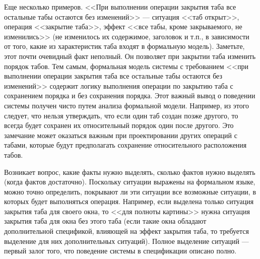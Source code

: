 \documentclass[14pt, twoside]{extreport}
\begin{document}
Еще несколько примеров. <<При выполнении операции закрытия таба все остальные табы остаются без изменений>> --- ситуация <<таб открыт>>, операция <<закрытие таба>>, эффект <<все табы, кроме закрываемого, не изменились>> (не изменилось их содержимое, заголовок и т.п., в зависимости от того, какие из характеристик таба входят в формальную модель). Заметьте, этот почти очевидный факт неполный. Он позволяет при закрытии таба изменить порядок табов. Тем самым, формальная модель системы с требованием <<при выполнении операции закрытия таба все остальные табы остаются без изменений>> содержит логику выполнения операции по закрытию таба с сохранением порядка и без сохранения порядка. Этот важный вывод о поведении системы получен чисто путем анализа формальной модели. Например, из этого следует, что нельзя утверждать, что если один таб создан позже другого, то всегда будет сохранен их относительный порядок один после другого. Это замечание может оказаться важным при проектировании других операций с табами, которые будут предполагать сохранение относительного расположения табов.

Возникает вопрос, какие факты нужно выделять, сколько фактов нужно выделять (когда фактов достаточно). %
Поскольку ситуации выражены на формальном языке, можно точно определить, покрывают ли эти ситуации все возможные ситуации, в которых будет выполняться операция. Например, если выделена только ситуация закрытия таба для своего окна, то <<для полноты картины>> нужна ситуация закрытия таба для окна без этого таба (если такие окна обладают дополнительной спецификой, влияющей на эффект закрытия таба, то требуется выделение для них дополнительных ситуаций). Полное выделение ситуаций --- первый залог того, что поведение системы в спецификации описано полно.
\end{document}

